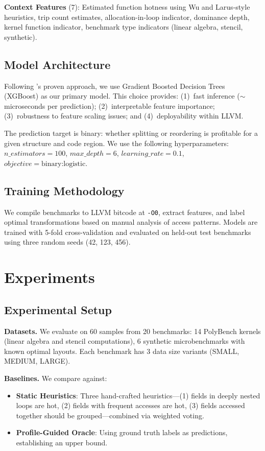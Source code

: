 \documentclass{article}
\begin{document}
\textbf{Context Features} (7): Estimated function hotness using Wu and Larus-style heuristics, trip count estimates, allocation-in-loop indicator, dominance depth, kernel function indicator, benchmark type indicators (linear algebra, stencil, synthetic).

\subsection{Model Architecture}

Following \citeauthor{rotem2021profile}'s proven approach, we use Gradient Boosted Decision Trees (XGBoost) as our primary model. This choice provides: (1)~fast inference ($\sim$microseconds per prediction); (2)~interpretable feature importance; (3)~robustness to feature scaling issues; and (4)~deployability within LLVM.

The prediction target is binary: whether splitting or reordering is profitable for a given structure and code region. We use the following hyperparameters: $n\_estimators=100$, $max\_depth=6$, $learning\_rate=0.1$, $objective=\text{binary:logistic}$.

\subsection{Training Methodology}

We compile benchmarks to LLVM bitcode at \texttt{-O0}, extract features, and label optimal transformations based on manual analysis of access patterns. Models are trained with 5-fold cross-validation and evaluated on held-out test benchmarks using three random seeds (42, 123, 456).

\section{Experiments}
\label{sec:experiments}

\subsection{Experimental Setup}

\textbf{Datasets.} We evaluate on 60 samples from 20 benchmarks: 14 PolyBench kernels (linear algebra and stencil computations), 6 synthetic microbenchmarks with known optimal layouts. Each benchmark has 3 data size variants (SMALL, MEDIUM, LARGE).

\textbf{Baselines.} We compare against:
\begin{itemize}
    \item \textbf{Static Heuristics}: Three hand-crafted heuristics---(1) fields in deeply nested loops are hot, (2) fields with frequent accesses are hot, (3) fields accessed together should be grouped---combined via weighted voting.
    \item \textbf{Profile-Guided Oracle}: Using ground truth labels as predictions, establishing an upper bound.
\end{itemize}
\end{document}
